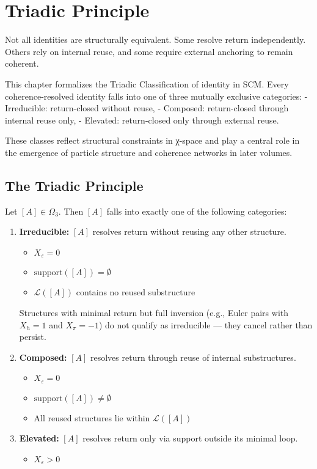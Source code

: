 \chapter{Triadic Principle}

Not all identities are structurally equivalent. Some resolve return
independently. Others rely on internal reuse, and some require external
anchoring to remain coherent.

This chapter formalizes the Triadic Classification of identity in SCM.
Every coherence-resolved identity falls into one of three mutually
exclusive categories:
- Irreducible: return-closed without reuse,
- Composed: return-closed through internal reuse only,
- Elevated: return-closed only through external reuse.

These classes reflect structural constraints in χ-space and play a
central role in the emergence of particle structure and coherence
networks in later volumes.

\section{The Triadic Principle} \label{the-triadic-principle}

Let $[A] \in \Omega_3$. Then $[A]$ falls into exactly one of the following categories:

\begin{enumerate}
  \item \textbf{Irreducible:}  
  $[A]$ resolves return without reusing any other structure.

  \begin{itemize}
    \item $X_\varepsilon = 0$
    \item $\text{support}([A]) = \emptyset$
    \item $\mathcal{L}([A])$ contains no reused substructure
  \end{itemize}

  Structures with minimal return but full inversion (e.g., Euler pairs with $X_h = 1$ and $X_\pi = -1$) do not qualify as irreducible — they cancel rather than persist.

  \item \textbf{Composed:}  
  $[A]$ resolves return through reuse of internal substructures.

  \begin{itemize}
    \item $X_\varepsilon = 0$
    \item $\text{support}([A]) \ne \emptyset$
    \item All reused structures lie within $\mathcal{L}([A])$
  \end{itemize}

  \item \textbf{Elevated:}  
  $[A]$ resolves return only via support outside its minimal loop.

  \begin{itemize}
    \item $X_\varepsilon > 0$
  \end{itemize}
\end{enumerate}

